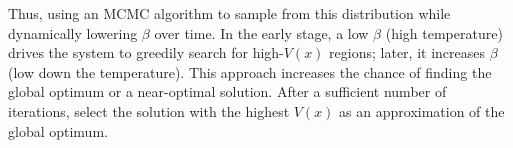 \begin{homeworkProblem}
Thus, using an MCMC algorithm to sample from this distribution while dynamically lowering $\beta$ over time. In the early stage, a low $\beta$ (high temperature) drives the system to greedily search for high-$V(x)$ regions; later, it increases $\beta$ (low down the temperature). This approach increases the chance of finding the global optimum or a near-optimal solution. After a sufficient number of iterations, select the solution with the highest $V(x)$ as an approximation of the global optimum.

\end{homeworkProblem}

\newpage